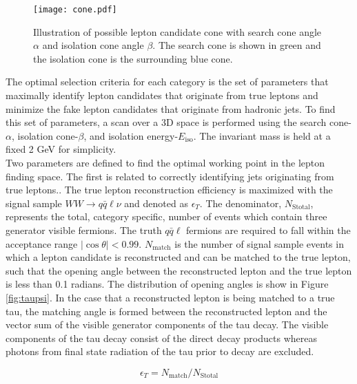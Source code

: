\begin{figure}[hp]
\centering
\captionsetup{justification=raggedright,margin=3cm}
\texttt{[image: cone.pdf]}
\caption{Illustration of possible lepton candidate cone with search cone angle $\alpha$ and isolation cone angle $\beta$. The search cone is shown in green and the isolation cone is the surrounding blue cone.}
\end{figure}


 The optimal selection criteria for each category is the set of parameters that maximally identify lepton candidates that originate from true leptons and minimize the fake lepton candidates that originate from hadronic jets. To find this set of parameters, a scan over a 3D space is performed using the search cone-$\alpha$, isolation cone-$\beta$, and isolation energy-$E_{\text{iso}}$. The invariant mass is held at a fixed 2 GeV for simplicity.\\
Two parameters are defined to find the optimal working point in the lepton finding space. The first is related to correctly identifying jets originating from true leptons..
The true lepton reconstruction efficiency is maximized with the signal sample $WW\rightarrow q\bar{q}\ell\nu$ and denoted as  $\epsilon_T$. The denominator, $N_{\text{Stotal}}$, represents the total, category specific, number of events which contain three generator visible fermions. The truth $q\bar{q}\ell$ fermions are required to fall within the acceptance range $|\cos\theta| < 0.99$. $N_{\text{match}}$ is the number of signal sample events in which a lepton candidate is reconstructed and can be matched to the true lepton, such that the opening angle between the reconstructed lepton and the true lepton is less than 0.1 radians. The distribution of opening angles is show in Figure \ref{fig:taupsi}. In the case that a reconstructed lepton is being matched to a true tau, the matching angle is formed between the reconstructed lepton and the vector sum of the visible generator components of the tau decay. The visible components of the tau decay consist of the direct decay products whereas photons from final state radiation of the tau prior to decay are excluded.

\begin{equation}
\label{eq:et}
\epsilon_T = N_{\text{match}}/N_{\text{Stotal}}
\end{equation}

